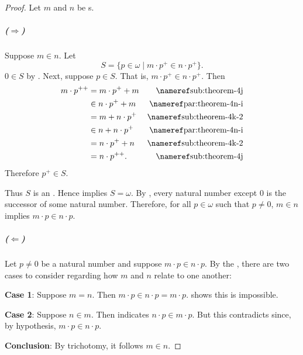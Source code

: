 \documentclass{report}
\begin{document}
\begin{proof}
      Let $m$ and $n$ be s.

      \subparagraph{($\Rightarrow$)}%

        Suppose $m \in n$.
        Let $$S = \{p \in \omega \mid m \cdot p^+ \in n \cdot p^+\}.$$
        $0 \in S$ by .
        Next, suppose $p \in S$.
        That is, $m \cdot p^+ \in n \cdot p^+$.
        Then
          \begin{align*}
            m \cdot p^{++}
              & = m \cdot p^+ + m & \textref{sub:theorem-4j} \\
              & \in n \cdot p^+ + m & \textref{par:theorem-4n-i} \\
              & = m + n \cdot p^+ & \textref{sub:theorem-4k-2} \\
              & \in n + n \cdot p^+ & \textref{par:theorem-4n-i} \\
              & = n \cdot p^+ + n & \textref{sub:theorem-4k-2} \\
              & = n \cdot p^{++}. & \textref{sub:theorem-4j}
          \end{align*}
        Therefore $p^+ \in S$.

        Thus $S$ is an .
        Hence  implies $S = \omega$.
        By , every natural number except 0 is the
          successor of some natural number.
        Therefore, for all $p \in \omega$ such that $p \neq 0$, $m \in n$
          implies $m \cdot p \in n \cdot p$.

      \subparagraph{($\Leftarrow$)}%

        Let $p \neq 0$ be a natural number and suppose $m \cdot p \in n \cdot p$.
        By the , there are two
          cases to consider regarding how $m$ and $n$ relate to one another:

        \vspace{8pt}
        \textbf{Case 1}: Suppose $m = n$.
        Then $m \cdot p \in n \cdot p = m \cdot p$.
         shows this is impossible.

        \vspace{8pt}
        \textbf{Case 2}: Suppose $n \in m$.
        Then  indicates
          $n \cdot p \in m \cdot p$.
        But this contradicts  since,
          by hypothesis, $m \cdot p \in n \cdot p$.

        \vspace{8pt}
        \textbf{Conclusion}: By trichotomy, it follows $m \in n$.

  \end{proof}
\end{document}
